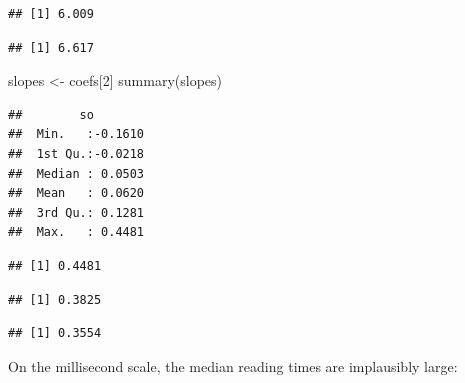 \documentclass[
  12pt,
]{krantz}
\newenvironment{Shaded}{\begin{snugshade}}{\end{snugshade}}
\newcommand{\AttributeTok}[1]{\textcolor[rgb]{0.77,0.63,0.00}{#1}}
\newcommand{\DecValTok}[1]{\textcolor[rgb]{0.00,0.00,0.81}{#1}}
\newcommand{\FunctionTok}[1]{\textcolor[rgb]{0.00,0.00,0.00}{#1}}
\newcommand{\NormalTok}[1]{#1}
\newcommand{\OtherTok}[1]{\textcolor[rgb]{0.56,0.35,0.01}{#1}}
\newcommand{\SpecialCharTok}[1]{\textcolor[rgb]{0.00,0.00,0.00}{#1}}
\newcommand{\StringTok}[1]{\textcolor[rgb]{0.31,0.60,0.02}{#1}}
\theoremstyle{definition}
\theoremstyle{definition}
\theoremstyle{definition}
\theoremstyle{definition}
\theoremstyle{remark}
\begin{document}
\begin{verbatim}
## [1] 6.009
\end{verbatim}

\begin{Shaded}
\end{Shaded}

\begin{verbatim}
## [1] 6.617
\end{verbatim}

\begin{Shaded}
\begin{Highlighting}[]
\NormalTok{slopes }\OtherTok{\textless{}{-}}\NormalTok{ coefs[}\DecValTok{2}\NormalTok{]}
\FunctionTok{summary}\NormalTok{(slopes)}
\end{Highlighting}
\end{Shaded}

\begin{verbatim}
##        so         
##  Min.   :-0.1610  
##  1st Qu.:-0.0218  
##  Median : 0.0503  
##  Mean   : 0.0620  
##  3rd Qu.: 0.1281  
##  Max.   : 0.4481
\end{verbatim}

\begin{Shaded}
\end{Shaded}

\begin{verbatim}
## [1] 0.4481
\end{verbatim}

\begin{verbatim}
## [1] 0.3825
\end{verbatim}

\begin{verbatim}
## [1] 0.3554
\end{verbatim}

On the millisecond scale, the median reading times are implausibly large:
\end{document}
